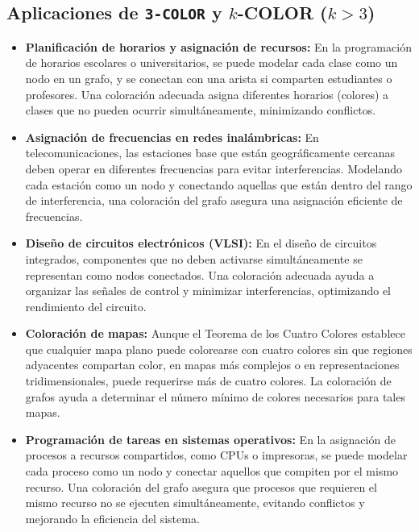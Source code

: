 \documentclass[a4paper,12pt]{article}
\begin{document}
\subsection{ Aplicaciones de \texttt{3-COLOR} y \(k\)-COLOR (\(k > 3\))}
\begin{itemize}
  \item \textbf{Planificación de horarios y asignación de recursos:} En la programación de horarios escolares o universitarios, se puede modelar cada clase como un nodo en un grafo, y se conectan con una arista si comparten estudiantes o profesores. Una coloración adecuada asigna diferentes horarios (colores) a clases que no pueden ocurrir simultáneamente, minimizando conflictos.

  \item \textbf{Asignación de frecuencias en redes inalámbricas:} En telecomunicaciones, las estaciones base que están geográficamente cercanas deben operar en diferentes frecuencias para evitar interferencias. Modelando cada estación como un nodo y conectando aquellas que están dentro del rango de interferencia, una coloración del grafo asegura una asignación eficiente de frecuencias.

  \item \textbf{Diseño de circuitos electrónicos (VLSI):} En el diseño de circuitos integrados, componentes que no deben activarse simultáneamente se representan como nodos conectados. Una coloración adecuada ayuda a organizar las señales de control y minimizar interferencias, optimizando el rendimiento del circuito.

  \item \textbf{Coloración de mapas:} Aunque el Teorema de los Cuatro Colores establece que cualquier mapa plano puede colorearse con cuatro colores sin que regiones adyacentes compartan color, en mapas más complejos o en representaciones tridimensionales, puede requerirse más de cuatro colores. La coloración de grafos ayuda a determinar el número mínimo de colores necesarios para tales mapas.

  \item \textbf{Programación de tareas en sistemas operativos:} En la asignación de procesos a recursos compartidos, como CPUs o impresoras, se puede modelar cada proceso como un nodo y conectar aquellos que compiten por el mismo recurso. Una coloración del grafo asegura que procesos que requieren el mismo recurso no se ejecuten simultáneamente, evitando conflictos y mejorando la eficiencia del sistema.
\end{itemize}
\end{document}
